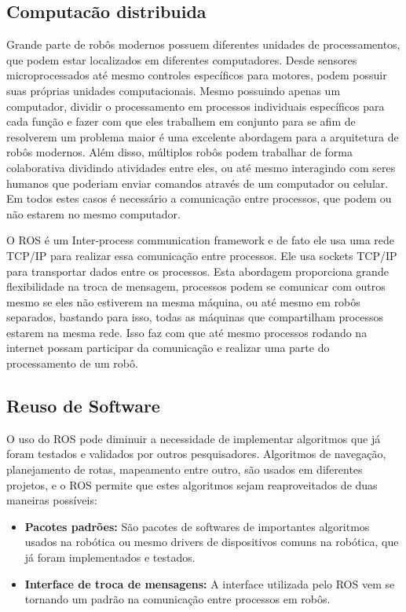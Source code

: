 \subsection{Computacão distribuida}
Grande parte de robôs modernos possuem diferentes unidades de processamentos, que podem estar localizados em diferentes computadores. Desde sensores microprocessados até mesmo controles específicos para motores, podem possuir suas próprias unidades computacionais. Mesmo possuindo apenas um computador, dividir o processamento em processos individuais específicos para cada função e fazer com que eles trabalhem em conjunto para se afim de resolverem um problema maior é uma excelente abordagem para a arquitetura de robôs modernos. Além disso, múltiplos robôs podem trabalhar de forma colaborativa dividindo atividades entre eles, ou até mesmo interagindo com seres humanos que poderiam enviar comandos através de um computador ou celular. Em todos estes casos é necessário a comunicação entre processos, que podem ou não estarem no mesmo computador. 

O ROS é um Inter-process communication framework e de fato ele usa uma rede TCP/IP para realizar essa comunicação entre processos. Ele usa sockets TCP/IP para transportar dados entre os processos. Esta abordagem proporciona grande flexibilidade na troca de mensagem, processos podem se comunicar com outros mesmo se eles não estiverem na mesma máquina, ou até mesmo em robôs separados, bastando para isso, todas as máquinas que compartilham processos estarem na mesma rede. Isso faz com que até mesmo processos rodando na internet possam participar da comunicação e realizar uma parte do processamento de um robô.


\subsection{Reuso de Software}
O uso do ROS pode diminuir a necessidade de implementar algoritmos que já foram testados e validados por outros pesquisadores. Algoritmos de navegação, planejamento de rotas, mapeamento entre outro, são usados em diferentes projetos, e o ROS permite que estes algoritmos sejam reaproveitados de duas maneiras possíveis:

\begin{itemize}
    \item \textbf{Pacotes padrões:} São pacotes de softwares de importantes algoritmos usados na robótica ou mesmo drivers de dispositivos comuns na robótica, que já foram implementados e testados.

    \item \textbf{Interface de troca de mensagens:} A interface utilizada pelo ROS vem se tornando um padrão na comunicação entre processos em robôs.
\end{itemize}

